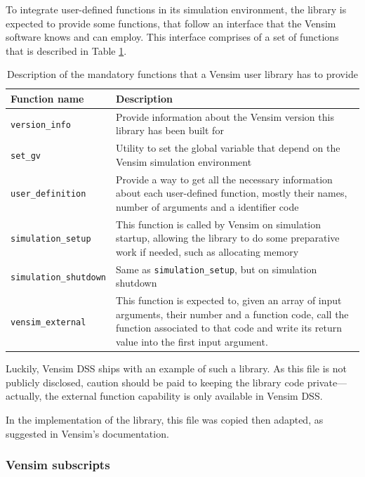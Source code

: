 To integrate user-defined functions in its simulation environment, the library is expected to provide some functions, that follow an interface that the Vensim software knows and can employ. This interface comprises of a set of functions that is described in Table \ref{table:vensim-interface}.
\begin{table}[h]
    \centering
    \begin{tabular}{|m{4.1cm}|m{12cm}|}
        \hline
        Function name & Description \\ \hline
        \texttt{version\_info} & Provide information about the Vensim version this library has been built for \\
        \texttt{set\_gv} & Utility to set the global variable that depend on the Vensim simulation environment \\
        \texttt{user\_definition} & Provide a way to get all the necessary information about each user-defined function, mostly their names, number of arguments and a identifier code \\
        \texttt{simulation\_setup} & This function is called by Vensim on simulation startup, allowing the library to do some preparative work if needed, such as allocating memory \\
        \texttt{simulation\_shutdown} & Same as \texttt{simulation\_setup}, but on simulation shutdown \\
        \texttt{vensim\_external} & This function is expected to, given an array of input arguments, their number and a function code, call the function associated to that code and write its return value into the first input argument.\\
        \hline
    \end{tabular}
    \caption{Description of the mandatory functions that a Vensim user library has to provide}
    \label{table:vensim-interface}
\end{table}

Luckily, %
Vensim DSS ships with an example of such a library. As this file is not publicly disclosed, caution should be paid to keeping the library code private---actually, the external function capability is only available in Vensim DSS.

In the implementation of the library, this file was copied then adapted, as suggested in Vensim's documentation.

\subsubsection{Vensim subscripts}


